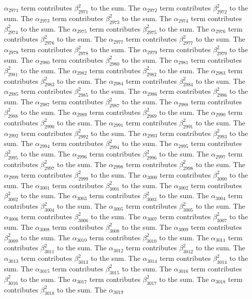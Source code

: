 \begin{lemma}
$\alpha_{2971}$ term contributes $\beta_{2971}^{2}$ to the sum. The $\alpha_{2972}$ term contributes $\beta_{2972}^{2}$ to the sum. The $\alpha_{2973}$ term contributes $\beta_{2973}^{2}$ to the sum. The $\alpha_{2974}$ term contributes $\beta_{2974}^{2}$ to the sum. The $\alpha_{2975}$ term contributes $\beta_{2975}^{2}$ to the sum. The $\alpha_{2976}$ term contributes $\beta_{2976}^{2}$ to the sum. The $\alpha_{2977}$ term contributes $\beta_{2977}^{2}$ to the sum. The $\alpha_{2978}$ term contributes $\beta_{2978}^{2}$ to the sum. The $\alpha_{2979}$ term contributes $\beta_{2979}^{2}$ to the sum. The $\alpha_{2980}$ term contributes $\beta_{2980}^{2}$ to the sum. The $\alpha_{2981}$ term contributes $\beta_{2981}^{2}$ to the sum. The $\alpha_{2982}$ term contributes $\beta_{2982}^{2}$ to the sum. The $\alpha_{2983}$ term contributes $\beta_{2983}^{2}$ to the sum. The $\alpha_{2984}$ term contributes $\beta_{2984}^{2}$ to the sum. The $\alpha_{2985}$ term contributes $\beta_{2985}^{2}$ to the sum. The $\alpha_{2986}$ term contributes $\beta_{2986}^{2}$ to the sum. The $\alpha_{2987}$ term contributes $\beta_{2987}^{2}$ to the sum. The $\alpha_{2988}$ term contributes $\beta_{2988}^{2}$ to the sum. The $\alpha_{2989}$ term contributes $\beta_{2989}^{2}$ to the sum. The $\alpha_{2990}$ term contributes $\beta_{2990}^{2}$ to the sum. The $\alpha_{2991}$ term contributes $\beta_{2991}^{2}$ to the sum. The $\alpha_{2992}$ term contributes $\beta_{2992}^{2}$ to the sum. The $\alpha_{2993}$ term contributes $\beta_{2993}^{2}$ to the sum. The $\alpha_{2994}$ term contributes $\beta_{2994}^{2}$ to the sum. The $\alpha_{2995}$ term contributes $\beta_{2995}^{2}$ to the sum. The $\alpha_{2996}$ term contributes $\beta_{2996}^{2}$ to the sum. The $\alpha_{2997}$ term contributes $\beta_{2997}^{2}$ to the sum. The $\alpha_{2998}$ term contributes $\beta_{2998}^{2}$ to the sum. The $\alpha_{2999}$ term contributes $\beta_{2999}^{2}$ to the sum. The $\alpha_{3000}$ term contributes $\beta_{3000}^{2}$ to the sum. The $\alpha_{3001}$ term contributes $\beta_{3001}^{2}$ to the sum. The $\alpha_{3002}$ term contributes $\beta_{3002}^{2}$ to the sum. The $\alpha_{3003}$ term contributes $\beta_{3003}^{2}$ to the sum. The $\alpha_{3004}$ term contributes $\beta_{3004}^{2}$ to the sum. The $\alpha_{3005}$ term contributes $\beta_{3005}^{2}$ to the sum. The $\alpha_{3006}$ term contributes $\beta_{3006}^{2}$ to the sum. The $\alpha_{3007}$ term contributes $\beta_{3007}^{2}$ to the sum. The $\alpha_{3008}$ term contributes $\beta_{3008}^{2}$ to the sum. The $\alpha_{3009}$ term contributes $\beta_{3009}^{2}$ to the sum. The $\alpha_{3010}$ term contributes $\beta_{3010}^{2}$ to the sum. The $\alpha_{3011}$ term contributes $\beta_{3011}^{2}$ to the sum. The $\alpha_{3012}$ term contributes $\beta_{3012}^{2}$ to the sum. The $\alpha_{3013}$ term contributes $\beta_{3013}^{2}$ to the sum. The $\alpha_{3014}$ term contributes $\beta_{3014}^{2}$ to the sum. The $\alpha_{3015}$ term contributes $\beta_{3015}^{2}$ to the sum. The $\alpha_{3016}$ term contributes $\beta_{3016}^{2}$ to the sum. The $\alpha_{3017}$ term contributes $\beta_{3017}^{2}$ to the sum. The $\alpha_{3018}$ term contributes $\beta_{3018}^{2}$ to the sum. The $\alpha_{3019}$ 
\end{lemma}
